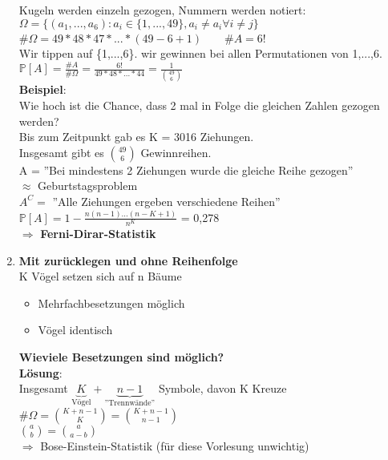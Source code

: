 \begin{enumerate}
	Kugeln werden einzeln gezogen, Nummern werden notiert:\\
	$\Omega = \{(a_1,...,a_6):a_i \in \{1,...,49\},a_i \neq a_i \forall i \neq j\}$\smallskip\\
	\#$\Omega = 49*48*47*...*(49-6+1) \qquad \#A = 6! $\medskip\\
	Wir tippen auf \{1,...,6\}. wir gewinnen bei allen Permutationen von 1,...,6.\\
	$\mathds{P}[A] = \frac{\#A}{\#\Omega}=\frac{6!}{49*48*...*44} = \frac{1}{\binom{49}{6}}$\medskip\\
	\textbf{Beispiel}:\\ Wie hoch ist die Chance, dass 2 mal in Folge die gleichen Zahlen gezogen werden?\\
	Bis zum Zeitpunkt gab es K = 3016 Ziehungen.\\
	Insgesamt gibt es $\binom{49}{6}$ Gewinnreihen.\medskip\\
	A = ''Bei mindestens 2 Ziehungen wurde die gleiche Reihe gezogen''\\$\approx$ Geburtstagsproblem\medskip\\
	$A^C = $ ''Alle Ziehungen ergeben verschiedene Reihen''\medskip\\
	$\mathds{P}[A] = 1 - \frac{n(n-1)...(n-K+1)}{n^K}$ = 0,278\medskip\\
	$\Rightarrow$ \textbf{Ferni-Dirar-Statistik}
	\newpage
	\item \textbf{Mit zurücklegen und ohne Reihenfolge}\\
	K Vögel setzen sich auf n Bäume
	\begin{itemize}
		\item 	Mehrfachbesetzungen möglich
		\item 	Vögel identisch
	\end{itemize}
	\textbf{Wieviele Besetzungen sind möglich?}\medskip\\
	\textbf{Lösung}:\\
	Insgesamt $\underbrace{K}_\text{Vögel}+\underbrace{n-1}_\text{''Trennwände''}$ Symbole, davon K Kreuze\medskip\\
	\#$\Omega = \binom{K+n-1}{K} = \binom{K+n-1}{n-1} $\medskip\\
	$\binom{a}{b} = \binom{a}{a-b}$\smallskip\\
	$\Rightarrow$ Bose-Einstein-Statistik (für diese Vorlesung unwichtig)
\end{enumerate}

